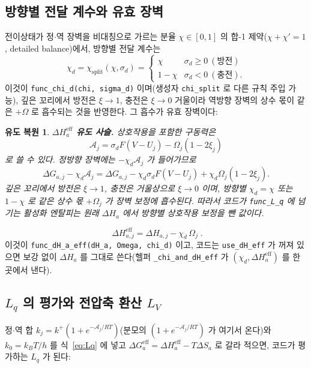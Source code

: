 \documentclass[11pt,a4paper]{article}
\newtheorem*{derivebox}{유도 복원}
\newcommand{\eff}{\mathrm{eff}}
\newcommand{\code}[1]{\texttt{#1}}
\begin{document}
\subsection{방향별 전달 계수와 유효 장벽}
전이상태가 정$\cdot$역 장벽을 비대칭으로 가르는 분율 $\chi\in[0,1]$ 의 합-1 제약($\chi+\chi'=1$, detailed balance)에서,
방향별 전달 계수는
\begin{equation}
\chi_d=\chi_\mathrm{split}(\chi,\sigma_d)=
\begin{cases}\chi & \sigma_d\ge0\ (\text{방전})\\ 1-\chi & \sigma_d<0\ (\text{충전}).\end{cases}
\label{eq:chid}
\end{equation}
이것이 \code{func\_chi\_d(chi, sigma\_d)} 이며(생성자 \code{chi\_split} 로 다른 규칙 주입 가능), 깊은 꼬리에서 방전은
$\xi\to1$, 충전은 $\xi\to0$ 거울이라 역방향 장벽의 상수 몫이 같은 $+\Omega$ 로 흡수되는 것을 반영한다. 그 흡수가 유효
장벽이다:

\begin{derivebox}
\textbf{$\Delta H_a^{\eff}$ 유도 사슬.} 상호작용을 포함한 구동력은
\begin{equation*}
\mathcal A_j=\sigma_dF(V-U_j)-\Omega_j(1-2\xi_j)
\end{equation*}
로 쓸 수 있다. 정방향 장벽에는 $-\chi_d\mathcal A_j$ 가 들어가므로
\begin{equation*}
\Delta G_{a,j}-\chi_d\mathcal A_j
=\Delta G_{a,j}-\chi_d\sigma_dF(V-U_j)+\chi_d\Omega_j(1-2\xi_j).
\end{equation*}
깊은 꼬리에서 방전은 $\xi\to1$, 충전은 거울상으로 $\xi\to0$ 이며, 방향별 $\chi_d=\chi$ 또는 $1-\chi$ 로 같은 상수 몫 $+\Omega_j$ 가 장벽 보정에 흡수된다. 따라서 코드가 \code{func\_L\_q} 에 넘기는 활성화 엔탈피는 원래 $\Delta H_a$ 에서 방향별 상호작용 보정을 뺀 값이다.
\end{derivebox}

\begin{equation}
\boxed{\;\Delta H_{a,j}^\eff=\Delta H_{a,j}-\chi_d\,\Omega_j\;.}
\label{eq:dHeff}
\end{equation}
이것이 \code{func\_dH\_a\_eff(dH\_a, Omega, chi\_d)} 이고, 코드는 \code{use\_dH\_eff} 가 꺼져 있으면 보강 없이
$\Delta H_a$ 를 그대로 쓴다(헬퍼 \code{\_chi\_and\_dH\_eff} 가 $(\chi_d,\Delta H_a^\eff)$ 를 한 곳에서 낸다).

\subsection{$L_q$ 의 평가와 전압축 환산 $L_V$}
정$\cdot$역 합 $k_j=k^+(1+e^{-\mathcal A_j/RT})$(분모의 $(1+e^{-\mathcal A_j/RT})$ 가 여기서 온다)와 $k_0=k_BT/h$ 를 식~\eqref{eq:Lq} 에 넣고 $\Delta G_a^\eff=\Delta H_a^\eff-T\Delta S_a$ 로 갈라 적으면,
코드가 평가하는 $L_q$ 가 된다:
\end{document}
